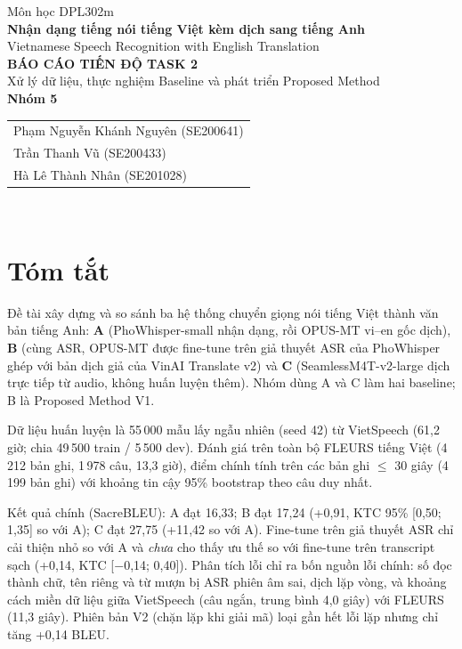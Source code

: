 \documentclass[12pt,a4paper]{article}
\begin{document}
\begin{titlepage}
\centering\vspace*{1.5cm}
{\large Môn học DPL302m}\\[0.4cm]
{\Large\bfseries Nhận dạng tiếng nói tiếng Việt kèm dịch sang tiếng Anh}\\[0.3cm]
{\large Vietnamese Speech Recognition with English Translation}\\[1.2cm]
{\Large\bfseries BÁO CÁO TIẾN ĐỘ TASK 2}\\[0.3cm]
{\large Xử lý dữ liệu, thực nghiệm Baseline và phát triển Proposed Method}\\[1.8cm]
{\large\bfseries Nhóm 5}\\[0.6cm]
\begin{tabular}{l}
Phạm Nguyễn Khánh Nguyên (SE200641)\\
Trần Thanh Vũ (SE200433)\\
Hà Lê Thành Nhân (SE201028)\\
\end{tabular}\\[2cm]
\end{titlepage}

\tableofcontents
\newpage

\section*{Tóm tắt}
Đề tài xây dựng và so sánh ba hệ thống chuyển giọng nói tiếng Việt thành văn bản tiếng Anh: \textbf{A} (PhoWhisper-small nhận dạng, rồi OPUS-MT vi--en gốc dịch), \textbf{B} (cùng ASR, OPUS-MT được fine-tune trên giả thuyết ASR của PhoWhisper ghép với bản dịch giả của VinAI Translate v2) và \textbf{C} (SeamlessM4T-v2-large dịch trực tiếp từ audio, không huấn luyện thêm). Nhóm dùng A và C làm hai baseline; B là Proposed Method V1.

Dữ liệu huấn luyện là 55\,000 mẫu lấy ngẫu nhiên (seed 42) từ VietSpeech (61,2 giờ; chia 49\,500 train / 5\,500 dev). Đánh giá trên toàn bộ FLEURS tiếng Việt (4\,212 bản ghi, 1\,978 câu, 13,3 giờ), điểm chính tính trên các bản ghi $\le$ 30 giây (4\,199 bản ghi) với khoảng tin cậy 95\% bootstrap theo câu duy nhất.

Kết quả chính (SacreBLEU): A đạt 16,33; B đạt 17,24 (+0,91, KTC 95\% [0,50; 1,35] so với A); C đạt 27,75 (+11,42 so với A). Fine-tune trên giả thuyết ASR chỉ cải thiện nhỏ so với A và \emph{chưa} cho thấy ưu thế so với fine-tune trên transcript sạch (+0,14, KTC [$-$0,14; 0,40]). Phân tích lỗi chỉ ra bốn nguồn lỗi chính: số đọc thành chữ, tên riêng và từ mượn bị ASR phiên âm sai, dịch lặp vòng, và khoảng cách miền dữ liệu giữa VietSpeech (câu ngắn, trung bình 4,0 giây) với FLEURS (11,3 giây). Phiên bản V2 (chặn lặp khi giải mã) loại gần hết lỗi lặp nhưng chỉ tăng +0,14 BLEU.
\end{document}
